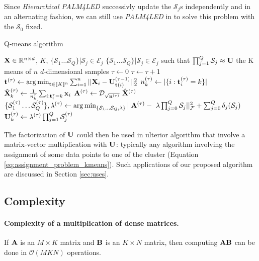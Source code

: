 Since \textit{Hierarchical PALM4LED} successivly update the $\mathcal{S}_j$s independently and in an alternating fashion, we can still use \textit{PALM4LED} in to solve this problem with the $\mathcal{S}_0$ fixed.


\begin{algorithm}
\caption{Q-means algorithm}
\label{algo:qmeans}
\begin{algorithmic}[1]


\REQUIRE ${\mathbf{X}} \in \mathbb{R}^{n \times d}$, $K$, $\{\mathcal{S}_1 \dots \mathcal{S}_{Q}\}|\mathcal{S}_j \in \mathcal{E}_j$
\ENSURE $\{\mathcal{S}_1 \dots \mathcal{S}_{Q}\}|\mathcal{S}_j \in \mathcal{E}_j$ such that $\prod_{j=1}^{Q}\mathcal{S}_j \approx {\mathbf{U}}$ the K means of $n$ $d$-dimensional samples
\STATE $\tau \leftarrow 0$
\REPEAT
\STATE $\tau \leftarrow \tau + 1$
\STATE ${\mathbf{t}}^{(\tau)} \leftarrow \operatorname*{arg\,min}_{{\mathbf{t}} \in [\![K]\!]^n} \sum_{i=1}^{n} {||{\mathbf{X}}_i - {\mathbf{U}}^{(\tau -1)}_{{\mathbf{t}}(i)}||_2^2}$
\label{line:qmeans:assignment}
\label{line:qmeans:startkmeans}
\STATE $n_k^{(\tau)} \leftarrow |\{i: {\mathbf{t}}^{(\tau)}_i=k\}|$
\STATE $\hat{{\mathbf{X}}}^{(\tau)}_k \leftarrow \frac{1}{n^\tau_k} \sum_{i: {\mathbf{t}}^\tau_i = k} {{\mathbf{x}}_i}$
\ENDFOR
\label{line:qmeans:endkmeans}
\STATE ${\mathbf{A}}^{(\tau)} \leftarrow \mathcal{D}_{\sqrt{{\mathbf{n}}^{(\tau)}}}~\hat{{\mathbf{X}}}^{(\tau)} $
\STATE $\{\mathcal{S}^{(\tau)}_1 \dots \mathcal{S}^{(\tau)}_{Q}\}, \lambda^{(\tau)} \leftarrow \operatorname*{arg\,min}_{\{\mathcal{S}_1 \dots \mathcal{S}_Q, \lambda\}} ||{\mathbf{A}}^{(\tau)} - ~\lambda\prod_{j=0}^{Q}{\mathcal{S}_j}||_\mathcal{F}^2 + \sum_{j=0}^{Q} \delta_j(\mathcal{S}_j)$
\STATE ${\mathbf{U}}^{(\tau)}_k \leftarrow \lambda^{(\tau)} \prod_{j=1}^{Q}{\mathcal{S}_j^{(\tau)}}$

\end{algorithmic}
\end{algorithm}


The factorization of ${\mathbf{U}}$ could then be used in ulterior algorithm that involve a matrix-vector multiplication with ${\mathbf{U}}$: typically any algorithm involving the assignment of some data points to one of the cluster (Equation \ref{eq:assignment_problem_kmeans}). Such applications of our proposed algorithm are discussed in Section \ref{sec:uses}.

\subsection{Complexity}
\paragraph{Complexity of a multiplication of dense matrices.}
If ${\mathbf{A}}$ is an $M\times K $ matrix and ${\mathbf{B}}$ is an $K \times N$ matrix, then computing ${\mathbf{A}} {\mathbf{B}}$ can be done in $\mathcal{O}\left (MKN\right )$ operations.


